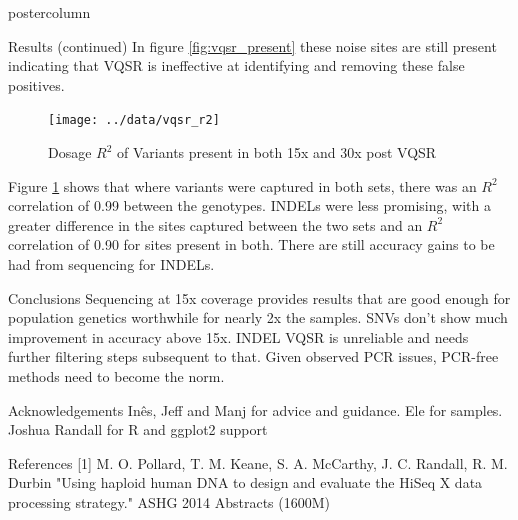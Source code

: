\documentclass[final,xcolor=table]{beamer}
\begin{document}
\begin{frame}{}
\begin{columns}[t]
\begin{column}{.49\textwidth}
\begin{beamercolorbox}[center,wd=\textwidth]{postercolumn}
\begin{minipage}[T]{.95\textwidth}
\begin{block}{Results (continued)}
                {In figure \ref{fig:vqsr_present} these noise sites are still present indicating that VQSR is ineffective at identifying and removing these false positives.}

                \begin{figure}
                \texttt{[image: ../data/vqsr\_r2]}
                \caption{Dosage $R^2$ of Variants present in both 15x and 30x post VQSR}
                \label{fig:r2}
                \end{figure}

                Figure \ref{fig:r2} shows that where variants were captured in both sets, there was an $R^2$ correlation of 0.99 between the genotypes. INDELs were less promising, with a greater difference in the sites captured between the two sets and an $R^2$ correlation of 0.90 for sites present in both. There are still accuracy gains to be had from sequencing for INDELs.

            \end{block}
            \begin{block}{Conclusions}
                Sequencing at 15x coverage provides results that are good enough for population genetics worthwhile for nearly 2x the samples. SNVs don't show much improvement in accuracy above 15x. INDEL VQSR is unreliable and needs further filtering steps subsequent to that. Given observed PCR issues, PCR-free methods need to become the norm.
            \end{block}
            \begin{block}{Acknowledgements}
                Inês, Jeff and Manj for advice and guidance. Ele for samples. Joshua Randall for R and ggplot2 support
            \end{block}
            \begin{block}{References}
                [1] M. O. Pollard, T. M. Keane, S. A. McCarthy, J. C. Randall, R. M. Durbin "Using haploid human DNA to design and evaluate the HiSeq X data processing strategy." ASHG 2014 Abstracts (1600M)

            \end{block}
            \vfill


            \end{minipage}
        \end{beamercolorbox}
    \end{column}
    \end{columns}

\end{frame}
\end{document}

